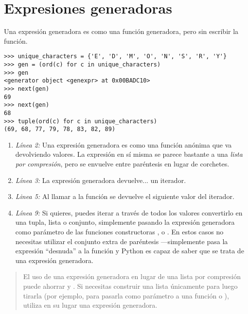 \section{Expresiones generadoras}

Una expresión generadora es como una función generadora, pero sin escribir la función.

\noindent\begin{minipage}{\textwidth}
\begin{lstlisting}[mathescape=True]
>>> unique_characters = {'E', 'D', 'M', 'O', 'N', 'S', 'R', 'Y'} 
>>> gen = (ord(c) for c in unique_characters)
>>> gen
<generator object <genexpr> at 0x00BADC10> 
>>> next(gen)
69 
>>> next(gen) 
68 
>>> tuple(ord(c) for c in unique_characters)
(69, 68, 77, 79, 78, 83, 82, 89)
\end{lstlisting}
\end{minipage}

\begin{enumerate}

\item \emph{Línea 2:} Una expresión generadora es como una función anónima que va devolviendo valores. La expresión en sí misma se parece bastante a una \emph{lista por compresión}, pero se envuelve entre paréntesis en lugar de corchetes.

\item \emph{Línea 3:} La expresión generadora devuelve... un iterador.

\item \emph{Linea 5:} Al llamar a la función  se devuelve el siguiente valor del iterador.

\item \emph{Línea 9:} Si quieres, puedes iterar a través de todos los valores convertirlo en una tupla, lista o conjunto, simplemente pasando la expresión generadora como parámetro de las funciones constructoras ,  o . En estos casos no necesitas utilizar el conjunto extra de paréntesis ---simplemente pasa la expresión ``desnuda''  a la función  y Python es capaz de saber que se trata de una expresión generadora.

\end{enumerate}

\begin{quote}
El uso de una expresión generadora en lugar de una lista por compresión puede ahorrar  y . Si necesitas construir una lista únicamente para luego tirarla (por ejemplo, para pasarla como parámetro a una función  o ), utiliza en su lugar una expresión generadora.
\end{quote}

